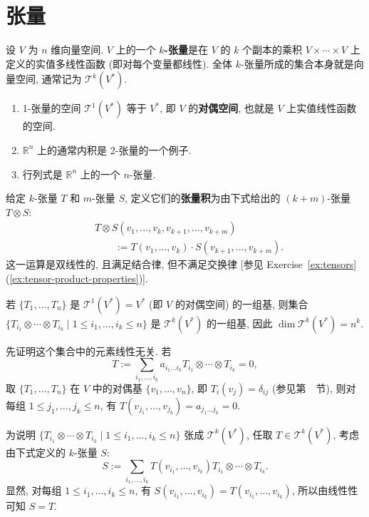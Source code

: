 \section{张量}\label{sec:tensors}

设 $V$ 为 $n$ 维向量空间. $V$ 上的一个 \textbf{$k$-张量}是在 $V$ 的 $k$ 个副本的乘积 $V\times\cdots\times V$ 上定义的实值多线性函数 (即对每个变量都线性). 全体 $k$-张量所成的集合本身就是向量空间, 通常记为 $\mathcal{T}^k(V^*)$.

\begin{RiemannExample}\label{ex:linear-functions-inner-product-determinant-as-tensors}
\begin{enumerate}[label=(\arabic*),leftmargin=*]
\item 1-张量的空间 $\mathcal{T}^1(V^*)$ 等于 $V^*$, 即 $V$ 的\textbf{对偶空间}, 也就是 $V$ 上实值线性函数的空间.
\item $\mathbb{R}^n$ 上的通常内积是 2-张量的一个例子.
\item 行列式是 $\mathbb{R}^n$ 上的一个 $n$-张量.
\end{enumerate}
\end{RiemannExample}

给定 $k$-张量 $T$ 和 $m$-张量 $S$, 定义它们的\textbf{张量积}为由下式给出的 $(k+m)$-张量 $T\otimes S$:
\begin{align*}
  &T\otimes S(v_1,\ldots,v_k,v_{k+1},\ldots,v_{k+m})\\
  &\qquad:=T(v_1,\ldots,v_k)\cdot S(v_{k+1},\ldots,v_{k+m}).
\end{align*}
这一运算是双线性的, 且满足结合律, 但不满足交换律 [参见 Exercise~\ref{ex:tensors}(\ref{ex:tensor-product-properties})].

\begin{RiemannProposition}\label{prop:basis-of-tensor-product-space}
若 $\{T_1,\ldots,T_n\}$ 是 $\mathcal{T}^1(V^*)=V^*$ (即 $V$ 的对偶空间) 的一组基, 则集合 $\{T_{i_1}\otimes\cdots\otimes T_{i_k}\mid 1\leq i_1,\ldots,i_k\leq n\}$ 是 $\mathcal{T}^k(V^*)$ 的一组基, 因此 $\dim\mathcal{T}^k(V^*)=n^k$.
\end{RiemannProposition}

\begin{RiemannProof}
先证明这个集合中的元素线性无关. 若
\[
  T:=\sum_{i_1,\ldots,i_k}a_{i_1\ldots i_k}T_{i_1}\otimes\cdots\otimes T_{i_k}=0,
\]
取 $\{T_1,\ldots,T_n\}$ 在 $V$ 中的对偶基 $\{v_1,\ldots,v_n\}$, 即 $T_i(v_j)=\delta_{ij}$ (参见第~~节), 则对每组 $1\leq j_1,\ldots,j_k\leq n$, 有 $T(v_{j_1},\ldots,v_{j_k})=a_{j_1\ldots j_k}=0$.

为说明 $\{T_{i_1}\otimes\cdots\otimes T_{i_k}\mid 1\leq i_1,\ldots,i_k\leq n\}$ 张成 $\mathcal{T}^k(V^*)$, 任取 $T\in\mathcal{T}^k(V^*)$, 考虑由下式定义的 $k$-张量 $S$:
\[
  S:=\sum_{i_1,\ldots,i_k}T(v_{i_1},\ldots,v_{i_k})T_{i_1}\otimes\cdots\otimes T_{i_k}.
\]
显然, 对每组 $1\leq i_1,\ldots,i_k\leq n$, 有 $S(v_{i_1},\ldots,v_{i_k})=T(v_{i_1},\ldots,v_{i_k})$, 所以由线性性可知 $S=T$.
\end{RiemannProof}

